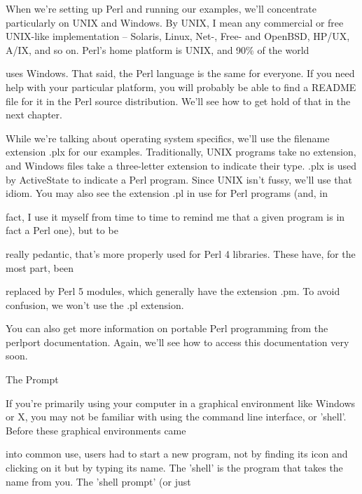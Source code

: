 \documentclass[a4paper,11pt]{book}
\begin{document}
\noindent When we're setting up Perl and running our examples, we'll concentrate particularly on UNIX and Windows. By UNIX, I mean any commercial or free UNIX-like implementation -- Solaris, Linux, Net-, Free- and OpenBSD, HP/UX, A/IX, and so on. Perl's home platform is UNIX, and 90\% of the world

\noindent uses Windows. That said, the Perl language is the same for everyone. If you need help with your particular platform, you will probably be able to find a README file for it in the Perl source distribution. We'll see how to get hold of that in the next chapter.

\noindent 

\noindent While we're talking about operating system specifics, we'll use the filename extension .plx for our examples. Traditionally, UNIX programs take no extension, and Windows files take a three-letter extension to indicate their type.  .plx is used by ActiveState to indicate a Perl program. Since UNIX isn't fussy, we'll use that idiom. You may also see the extension .pl in use for Perl programs (and, in

\noindent fact, I use it myself from time to time to remind me that a given program is in fact a Perl one), but to be

\noindent really pedantic, that's more properly used for Perl 4 libraries. These have, for the most part, been

\noindent replaced by Perl 5 modules, which generally have the extension .pm. To avoid confusion, we won't use the .pl extension.

\noindent 

\noindent You can also get more information on portable Perl programming from the perlport documentation. Again, we'll see how to access this documentation very soon.

\noindent 

\noindent 

\noindent The Prompt

\noindent 

\noindent If you're primarily using your computer in a graphical environment like Windows or X, you may not be familiar with using the command line interface, or 'shell'. Before these graphical environments came

\noindent into common use, users had to start a new program, not by finding its icon and clicking on it but by typing its name. The 'shell' is the program that takes the name from you. The 'shell prompt' (or just
\end{document}
